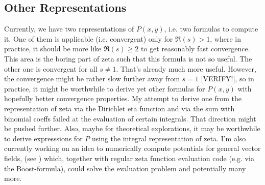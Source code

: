 \documentclass[12pt]{article}
\begin{document}
\subsection{Other Representations}
Currently, we have two representations of $P(x,y)$, i.e. two formulas to compute it. One of them is applicable (i.e. convergent) only for $\Re(s) > 1$, where in practice, it should be more like $\Re(s) \geq 2$ to get reasonably fast convergence. This area is the boring part of zeta such that this formula is not so useful. The other one is convergent for all $s \neq 1$. That's already much more useful. However, the convergence might be rather slow further away from $s=1$ [VERIFY!], so in practice, it might be worthwhile to derive yet other formulas for $P(x,y)$ with hopefully better convergence properties. My attempt to derive one from the representation of zeta via the Dirichlet eta function and via the sum with binomial coeffs failed at the evaluation of certain integrals. That direction might be pushed further. Also, maybe for theoretical explorations, it may be worthwhile to derive expresssions for $P$ using the integral representation of zeta. I'm also currently working on an idea to numerically compute potentials for general vector fields, (see \cite{PotentialNumerical}) which, together with regular zeta function evaluation code (e.g. via the Boost-formula), could solve the evaluation problem and potentially many more.









\end{document}

